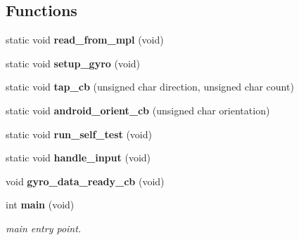\subsection*{Functions}
\begin{DoxyCompactItemize}
\item 
static void \textbf{ read\+\_\+from\+\_\+mpl} (void)
\item 
static void \textbf{ setup\+\_\+gyro} (void)
\item 
static void \textbf{ tap\+\_\+cb} (unsigned char direction, unsigned char count)
\item 
static void \textbf{ android\+\_\+orient\+\_\+cb} (unsigned char orientation)
\item 
static void \textbf{ run\+\_\+self\+\_\+test} (void)
\item 
static void \textbf{ handle\+\_\+input} (void)
\item 
void \textbf{ gyro\+\_\+data\+\_\+ready\+\_\+cb} (void)
\item 
int \textbf{ main} (void)
\begin{DoxyCompactList}\small\item\em main entry point. \end{DoxyCompactList}\end{DoxyCompactItemize}
